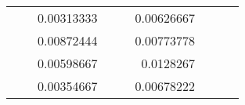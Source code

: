 \begin{table}[H]
\begin{tabular}{|ccrccrccc}
\multicolumn{1}{|c|}{\cellcolor[HTML]{FFFFC7}}                                & \multicolumn{1}{c|}{\cellcolor[HTML]{DDFDFF}}                      & \multicolumn{1}{r|}{\cellcolor[HTML]{DAE8FC}0.00313333}  & \multicolumn{1}{c|}{\cellcolor[HTML]{FFFFC7}}                                & \multicolumn{1}{c|}{\cellcolor[HTML]{DDFDFF}}                       & \multicolumn{1}{r|}{\cellcolor[HTML]{DDFDFF}0.00626667}  &                                                                              &                                                                    &                                                          \\ \cline{3-3} \cline{6-6}
\multicolumn{1}{|c|}{\cellcolor[HTML]{FFFFC7}}                                & \multicolumn{1}{c|}{\cellcolor[HTML]{DDFDFF}}                      & \multicolumn{1}{r|}{\cellcolor[HTML]{DDFDFF}0.00872444}  & \multicolumn{1}{c|}{\cellcolor[HTML]{FFFFC7}}                                & \multicolumn{1}{c|}{\cellcolor[HTML]{DDFDFF}}                       & \multicolumn{1}{r|}{\cellcolor[HTML]{DAE8FC}0.00773778}  &                                                                              &                                                                    &                                                          \\ \cline{3-3} \cline{6-6}
\multicolumn{1}{|c|}{\cellcolor[HTML]{FFFFC7}}                                & \multicolumn{1}{c|}{\cellcolor[HTML]{DDFDFF}}                      & \multicolumn{1}{r|}{\cellcolor[HTML]{DAE8FC}0.00598667}  & \multicolumn{1}{c|}{\cellcolor[HTML]{FFFFC7}}                                & \multicolumn{1}{c|}{\cellcolor[HTML]{DDFDFF}}                       & \multicolumn{1}{r|}{\cellcolor[HTML]{DDFDFF}0.0128267}   &                                                                              &                                                                    &                                                          \\ \cline{3-3} \cline{6-6}
\multicolumn{1}{|c|}{\cellcolor[HTML]{FFFFC7}}                                & \multicolumn{1}{c|}{\cellcolor[HTML]{DDFDFF}}                      & \multicolumn{1}{r|}{\cellcolor[HTML]{DDFDFF}0.00354667}  & \multicolumn{1}{c|}{\cellcolor[HTML]{FFFFC7}}                                & \multicolumn{1}{c|}{\cellcolor[HTML]{DDFDFF}}                       & \multicolumn{1}{r|}{\cellcolor[HTML]{DAE8FC}0.00678222}  &                                                                              &                                                                    &                                                          \\ \cline{3-3} \cline{6-6}

\end{tabular}
\end{table}
